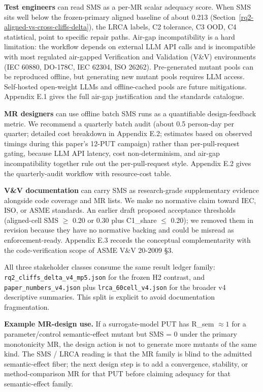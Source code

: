 \documentclass[manuscript,screen,review]{acmart}
\begin{document}
\textbf{Test engineers} can read SMS as a per-MR scalar adequacy score.
When SMS sits well below the frozen-primary aligned baseline of about
0.213 (Section~\ref{rq2-aligned-vs-cross-cliffs-delta}), the
LRCA labels, C2 tolerance, C3 OOD, C4 statistical, point to specific
repair paths. Air-gap incompatibility is a hard limitation: the workflow
depends on external LLM API calls and is incompatible with most
regulated air-gapped Verification and Validation (V\&V) environments
(IEC 60880, DO-178C, IEC 62304, ISO 26262). Pre-generated mutant pools
can be reproduced offline, but generating new mutant pools requires LLM
access. Self-hosted open-weight LLMs and offline-cached pools are future
mitigations. Appendix E.1 gives the full air-gap justification and the
standards catalogue.

\textbf{MR designers} can use offline batch SMS runs as a quantifiable
design-feedback metric. We recommend a quarterly batch audit (about 0.5
person-day per quarter; detailed cost breakdown in Appendix E.2;
estimates based on observed timings during this paper's 12-PUT campaign)
rather than per-pull-request gating, because LLM API latency, cost
non-determinism, and air-gap incompatibility together rule out the
per-pull-request style. Appendix E.2 gives the quarterly-audit workflow
with resource-cost table.

\textbf{V\&V documentation} can carry SMS as research-grade
supplementary evidence alongside code coverage and MR lists. We make no
normative claim toward IEC, ISO, or ASME standards. An earlier draft
proposed acceptance thresholds (aligned-cell SMS $\geq$ 0.20 or 0.30 plus
C1\_share $\leq$ 0.20); we removed them in revision because they have no
normative backing and could be misread as enforcement-ready. Appendix
E.3 records the conceptual complementarity with the code-verification
scope of ASME V\&V 20-2009 §3.

All three stakeholder classes consume the same result ledger family:
\texttt{rq2\_cliffs\_delta\_v4\_mp5.json} for the frozen H2 contrast,
and \texttt{paper\_numbers\_v4.json} plus \texttt{lrca\_60cell\_v4.json}
for the broader v4 descriptive summaries. This split is explicit to
avoid documentation fragmentation.

\textbf{Example MR-design use.} If a surrogate-model PUT has
R\_sem $\approx 1$ for a parameter/control semantic-effect mutant but SMS = 0 under the
primary monotonicity MR, the design action is not to generate more
mutants of the same kind. The SMS / LRCA reading is that the MR family is
blind to the admitted semantic-effect fiber; the next design step is to
add a convergence, stability, or method-comparison MR for that PUT before
claiming adequacy for that semantic-effect family.
\end{document}
